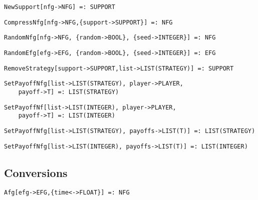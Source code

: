 \protect \large \begin{verbatim}
NewSupport[nfg->NFG] =: SUPPORT
\end{verbatim}\normalsize

\protect \large \begin{verbatim}
CompressNfg[nfg->NFG,{support->SUPPORT}] =: NFG
\end{verbatim}\normalsize

\protect \large \begin{verbatim}
RandomNfg[nfg->NFG, {random->BOOL}, {seed->INTEGER}] =: NFG
\end{verbatim}\normalsize

\protect \large \begin{verbatim}
RandomEfg[efg->EFG, {random->BOOL}, {seed->INTEGER}] =: EFG
\end{verbatim}\normalsize

\protect \large \begin{verbatim}
RemoveStrategy[support->SUPPORT,list->LIST(STRATEGY)] =: SUPPORT
\end{verbatim}\normalsize

\protect \large \begin{verbatim}
SetPayoffNfg[list->LIST(STRATEGY), player->PLAYER, 
	payoff->T] =: LIST(STRATEGY)
\end{verbatim}\normalsize

\protect \large \begin{verbatim}
SetPayoffNf[list->LIST(INTEGER), player->PLAYER, 
	payoff->T] =: LIST(INTEGER)
\end{verbatim}\normalsize

\protect \large \begin{verbatim}
SetPayoffNfg[list->LIST(STRATEGY), payoffs->LIST(T)] =: LIST(STRATEGY)
\end{verbatim}\normalsize

\protect \large \begin{verbatim}
SetPayoffNfg[list->LIST(INTEGER), payoffs->LIST(T)] =: LIST(INTEGER)
\end{verbatim}\normalsize

\medskip
\subsection{Conversions}


\protect \large \begin{verbatim}
Afg[efg->EFG,{time<->FLOAT}] =: NFG
\end{verbatim}\normalsize


